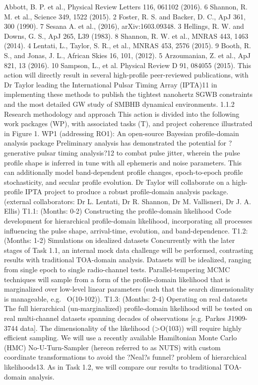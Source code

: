 \documentclass[11pt,letterpaper,sans]{moderncv} %
\begin{document}
  Abbott, B. P. et al., Physical Review Letters 116, 061102 (2016).		6 Shannon, R. M. et al., Science 349, 1522 (2015).
2 Foster, R. S. and Backer, D. C., ApJ 361, 300 (1990).			7 Sesana A. et al., (2016), arXiv:1603.09348.
3 Hellings, R. W. and Downs, G. S., ApJ 265, L39 (1983).	8 Shannon, R. W. et al., MNRAS 443, 1463 (2014).
4 Lentati, L., Taylor, S. R., et al., MNRAS 453, 2576 (2015).	9   Booth, R. S., and Jonas, J. L., African Skies 16, 101, (2012).
5 Arzoumanian, Z. et al., ApJ 821, 13 (2016).	10 Sampson, L., et al. Physical Review D 91, 084055 (2015).
This action will directly result in several high-profile peer-reviewed publications, with Dr Taylor leading the International Pulsar Timing Array (IPTA)11 in implementing these methods to publish the tightest nanohertz SGWB constraints and the most detailed GW study of SMBHB dynamical environments.
1.1.2  Research methodology and approach 
This action is divided into the following work packages (WP), with associated tasks (T), and project coherence illustrated in Figure 1. 
WP1 (addressing RO1): An open-source Bayesian profile-domain analysis package
Preliminary analysis has demonstrated the potential for ?generative pulsar timing analysis?12 to combat pulse jitter, wherein the pulse profile shape is inferred in tune with all ephemeris and noise parameters. This can additionally model band-dependent profile changes, epoch-to-epoch profile stochasticity, and secular profile evolution. Dr Taylor will collaborate on a high-profile IPTA project to produce a robust profile-domain analysis package. (external collaborators: Dr L. Lentati, Dr R. Shannon, Dr M. Vallisneri, Dr J. A. Ellis)
T1.1: (Months: 0-2) Constructing the profile-domain likelihood 
Code development for hierarchical profile-domain likelihood, incorporating all processes influencing the pulse shape, arrival-time, evolution, and band-dependence. 
T1.2: (Months: 1-2) Simulations on idealized datasets 
Concurrently with the later stages of Task 1.1, an internal mock data challenge will be performed, contrasting results with traditional TOA-domain analysis. Datasets will be idealized, ranging from single epoch to single radio-channel tests. Parallel-tempering MCMC techniques will sample from a form of the profile-domain likelihood that is marginalized over low-level linear parameters (such that the search dimensionality is manageable, e.g. ~O(10-102)).
T1.3: (Months: 2-4) Operating on real datasets 
The full hierarchical (un-marginalized) profile-domain likelihood will be tested on real multi-channel datasets spanning decades of observations [e.g. Parkes J1909-3744 data]. The dimensionality of the likelihood (>O(103)) will require highly efficient sampling. We will use a recently available Hamiltonian Monte Carlo (HMC) No-U-Turn-Sampler (hereon referred to as NUTS) with custom coordinate transformations to avoid the ?Neal?s funnel? problem of hierarchical likelihoods13. As in Task 1.2, we will compare our results to traditional TOA-domain analysis.
\end{document}
